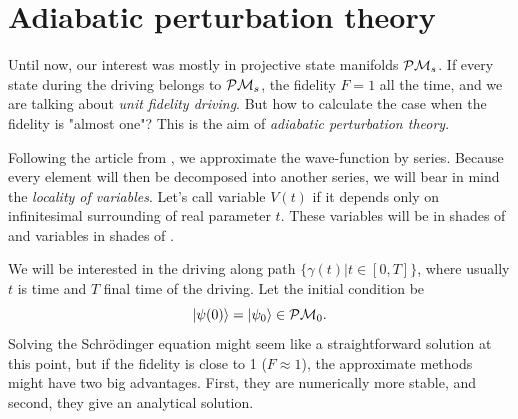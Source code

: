 











\section{Adiabatic perturbation theory}
Until now, our interest was mostly in projective state manifolds $\mathcal{P}\mathcal{M}_s$. If every state during the driving belongs to $\mathcal{P}\mathcal{M}_s$, the fidelity $F=1$ all the time, and we are talking about \emph{unit fidelity driving}. But how to calculate the case when the fidelity is "almost one"? This is the aim of \emph{adiabatic perturbation theory}.


Following the article from \cite{Rigolin2008}, we approximate the wave-function by series. Because every element will then be decomposed into another series, we will bear in mind the \emph{locality of variables}. Let's call variable $V(t)$ \emph{} if it depends only on infinitesimal surrounding of real parameter $t$. These variables will be in shades of  and  variables in shades of .

We will be interested in the driving along path $\{\gamma(t)|t\in[0,T]\}$, where usually $t$ is time and $T$ final time of the driving. Let the initial condition be
\begin{equation}
    \ket{\psi(0)}=\ket{\psi_0}\in \mathcal{P}\mathcal{M}_0.
\end{equation}
Solving the Schr\"odinger equation might seem like a straightforward solution at this point, but if the fidelity is close to 1 ($F\approx 1$), the approximate methods might have two big advantages. First, they are numerically more stable, and second, they give an analytical solution.

